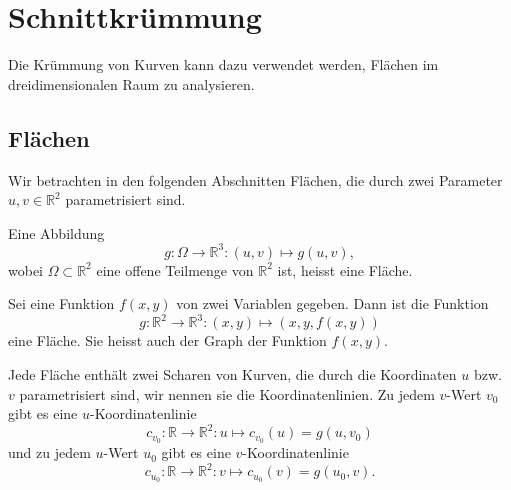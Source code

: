 %
%
%
\section{Schnittkrümmung}
Die Krümmung von Kurven kann dazu verwendet werden, Flächen im
dreidimensionalen Raum zu analysieren.

\subsection{Flächen}
Wir betrachten in den folgenden Abschnitten Flächen, die durch zwei
Parameter $u,v\in\mathbb R^2$ parametrisiert sind.

\begin{definition}
Eine Abbildung
\[
g\colon \Omega\to\mathbb R^3: (u,v)\mapsto g(u,v),
\]
wobei $\Omega\subset\mathbb R^2$
eine offene Teilmenge von $\mathbb R^2$ ist, heisst eine Fläche.
\end{definition}

\begin{beispiel}
Sei eine Funktion $f(x,y)$ von zwei Variablen gegeben.
Dann ist die Funktion
\[
g\colon\mathbb R^2\to \mathbb R^3
: (x,y)\mapsto (x,y,f(x,y))
\]
eine Fläche.
Sie heisst auch der Graph der Funktion $f(x,y)$.
%
\end{beispiel}

Jede Fläche enthält zwei Scharen von Kurven, die durch die Koordinaten $u$
bzw.~$v$ parametrisiert sind, wir nennen sie die Koordinatenlinien.
%
Zu jedem $v$-Wert $v_0$ gibt es eine $u$-Koordinatenlinie
\[
c_{v_0}
\colon
\mathbb R \to \mathbb R^2
:
u\mapsto
c_{v_0}(u) = g(u, v_0)
\]
und zu jedem $u$-Wert $u_0$ gibt es eine $v$-Koordinatenlinie
\[
c_{u_0}
\colon
\mathbb R \to \mathbb R^2
:
v\mapsto
c_{u_0}(v) = g(u_0, v).
\]

